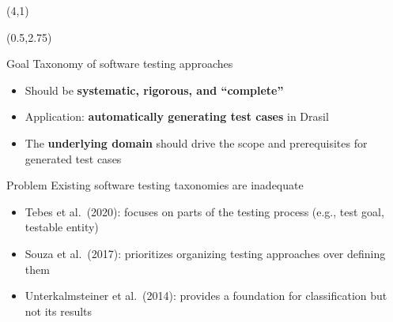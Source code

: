 \documentclass[22pt]{beamer}
\begin{document}
\begin{frame}[fragile]
    \begin{textblock}{8}(4,1)
        \titlepage
    \end{textblock}

    \begin{textblock}{7.25}(0.5,2.75)
        \begin{block}{\fontsize{37}{20}\selectfont Goal}
            Taxonomy of software testing approaches
            \begin{itemize}
                \item Should be \textbf{systematic, rigorous, and ``complete''}
                \item Application: \textbf{automatically generating test cases}
                      in Drasil \cite{Drasil}
                \item The \textbf{underlying domain} should drive the scope and
                      prerequisites for generated test cases
            \end{itemize}

            \vspace{5mm}
        \end{block}

        \begin{block}{\fontsize{37}{20}\selectfont Problem}
            Existing software testing taxonomies are inadequate
            \begin{itemize}
                \item Tebes et al.~(2020): focuses on parts of the
                      testing process (e.g., test goal, testable entity)
                \item Souza et al.~(2017): prioritizes organizing testing
                      approaches over defining them
                \item Unterkalmsteiner et al.~(2014): provides a foundation for
                      classification but not its results
            \end{itemize}
            \vspace{5mm}
        \end{block}


\end{textblock}
\end{frame}
\end{document}
